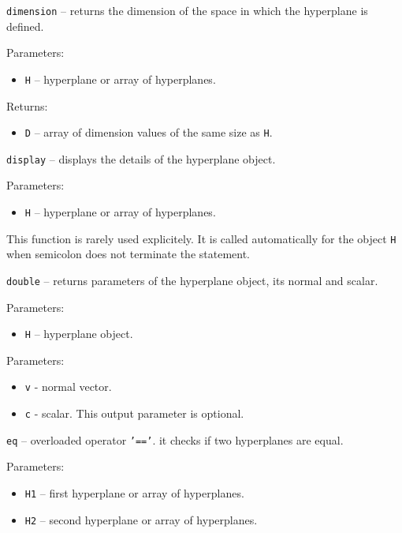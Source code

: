 

\newpage

{\Large {\tt dimension}} -- returns the dimension of the space in which
the hyperplane is defined.

Parameters:
\begin{itemize}
\item {\tt H} -- hyperplane or array of hyperplanes.
\end{itemize}

Returns:
\begin{itemize}
\item {\tt D} -- array of dimension values of the same size as {\tt H}.
\end{itemize}



\newpage

{\Large {\tt display}} -- displays the details of the hyperplane object.

Parameters:
\begin{itemize}
\item {\tt H} -- hyperplane or array of hyperplanes.
\end{itemize}
This function is rarely used explicitely. It is called automatically
for the object {\tt H} when semicolon does not terminate the statement.

\newpage

{\Large {\tt double}} -- returns parameters of the hyperplane object,
its normal and scalar.

Parameters:
\begin{itemize}
\item {\tt H} -- hyperplane object.
\end{itemize}

Parameters:
\begin{itemize}
\item {\tt v} - normal vector.
\item {\tt c} - scalar. This output parameter is optional.
\end{itemize}

\newpage

{\Large {\tt eq}} -- overloaded operator {\tt '=='}.
it checks if two hyperplanes are equal.

Parameters:
\begin{itemize}
\item {\tt H1} -- first hyperplane or array of hyperplanes.
\item {\tt H2} -- second hyperplane or array of hyperplanes.
\end{itemize}

